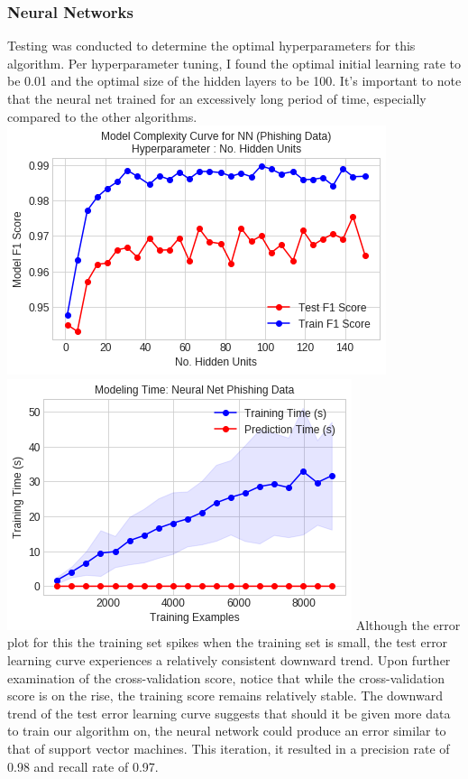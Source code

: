 \documentclass[11pt, a4paper]{article} %
\begin{document}
\subsubsection{Neural Networks}
Testing was conducted to determine the optimal hyperparameters for this algorithm. Per hyperparameter tuning, I found the optimal initial learning rate to be 0.01 and the optimal size of the hidden layers to be 100. It's important to note that the neural net trained for an excessively long period of time, especially compared to the other algorithms.
\newline\newline
\includegraphics[scale=0.55]{NN_Model_Complexity_Curve.png}
\includegraphics[scale=0.55]{NN_Modeling_Time.png}
\newline\newline
Although the error plot for this the training set spikes when the training set is small, the test error learning curve experiences a relatively consistent downward trend. Upon further examination of the cross-validation score, notice that while the cross-validation score is on the rise, the training score remains relatively stable. The downward trend of the test error learning curve suggests that should it be given more data to train our algorithm on, the neural network could produce an error similar to that of support vector machines. This iteration, it resulted in a precision rate of 0.98 and recall rate of 0.97.
\end{document}
